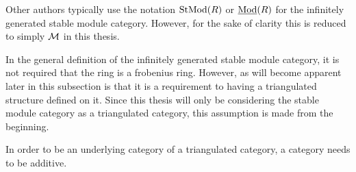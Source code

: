 Other authors typically use the notation \( \operatorname{StMod}(R) \) or \( \underline{\operatorname{Mod}}(R) \) for the infinitely generated stable module category. However, for the sake of clarity this is reduced to simply \( {\mathcal{M}} \) in this thesis.

In the general definition of the infinitely generated stable module category, it is not required that the ring is a frobenius ring. However, as will become apparent later in this subsection is that it is a requirement to having a triangulated structure defined on it. Since this thesis will only be considering the stable module category as a triangulated category, this assumption is made from the beginning.

In order to be an underlying category of a triangulated category, a category needs to be additive.

